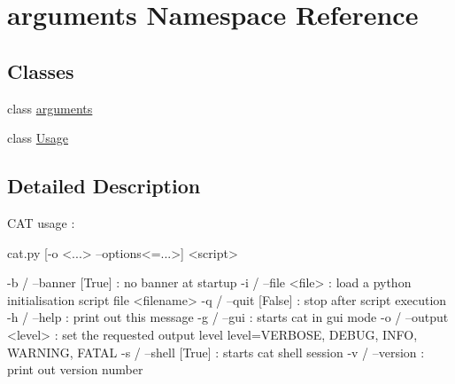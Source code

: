 \hypertarget{namespacearguments}{}\section{arguments Namespace Reference}
\label{namespacearguments}
\subsection*{Classes}
\begin{DoxyCompactItemize}
\item 
class \hyperlink{classarguments_1_1arguments}{arguments}
\item 
class \hyperlink{classarguments_1_1Usage}{Usage}
\end{DoxyCompactItemize}


\subsection{Detailed Description}
\begin{DoxyVerb}CAT usage :

cat.py [-o <...> --options<=...>] <script>

  -b / --banner [True]   : no banner at startup
  -i / --file   <file>   : load a python initialisation script file <filename>
  -q / --quit   [False]  : stop after script execution
  -h / --help            : print out this message
  -g / --gui             : starts cat in gui mode
  -o / --output <level>  : set the requested output level
          level=VERBOSE, DEBUG, INFO, WARNING, FATAL
  -s / --shell  [True]  : starts cat shell session
  -v / --version         : print out version number
\end{DoxyVerb}
 